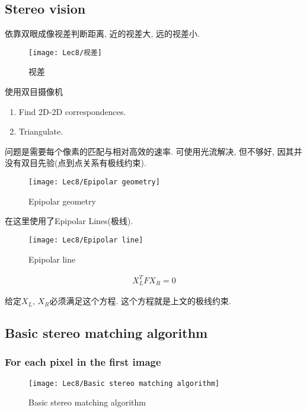 \subsection{Stereo vision}
依靠双眼成像视差判断距离, 近的视差大, 远的视差小. 
\begin{figure}[H]
    \centering
    \texttt{[image: Lec8/视差]}
    \caption{视差}
\end{figure}

使用双目摄像机
\begin{enumerate}
    \item Find 2D-2D correspondences. 
    \item Triangulate. 
\end{enumerate}

问题是需要每个像素的匹配与相对高效的速率. 可使用光流解决, 但不够好, 因其并没有双目先验(点到点关系有极线约束). 

\begin{figure}[H]
    \centering
    \texttt{[image: Lec8/Epipolar geometry]}
    \caption{Epipolar geometry}
\end{figure}

在这里使用了Epipolar Lines(极线). 

\begin{figure}[H]
    \centering
    \texttt{[image: Lec8/Epipolar line]}
    \caption{Epipolar line}
\end{figure}

\begin{align*}
    X_L^T F X_R =0
\end{align*}

给定$X_L$, $X_R$必须满足这个方程. 这个方程就是上文的极线约束. 

\subsection{Basic stereo matching algorithm}

\subsubsection{For each pixel in the first image}

\begin{figure}[H]
    \centering
    \texttt{[image: Lec8/Basic stereo matching algorithm]}
    \caption{Basic stereo matching algorithm}
\end{figure}

